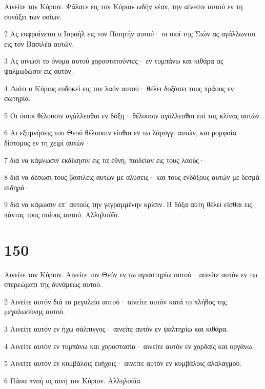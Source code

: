 \par Αινείτε τον Κύριον. Ψάλατε εις τον Κύριον ωδήν νέαν, την αίνεσιν αυτού εν τη συνάξει των οσίων.
\par 2 Ας ευφραίνεται ο Ισραήλ εις τον Ποιητήν αυτού· οι υιοί της Σιών ας αγάλλωνται εις τον Βασιλέα αυτών.
\par 3 Ας αινώσι το όνομα αυτού χοροστατούντες· εν τυμπάνω και κιθάρα ας ψαλμωδώσιν εις αυτόν.
\par 4 Διότι ο Κύριος ευδοκεί εις τον λαόν αυτού· θέλει δοξάσει τους πράους εν σωτηρία.
\par 5 Οι όσιοι θέλουσιν αγάλλεσθαι εν δόξη· θέλουσιν αγάλλεσθαι επί τας κλίνας αυτών.
\par 6 Αι εξυμνήσεις του Θεού θέλουσιν είσθαι εν τω λάρυγγι αυτών, και ρομφαία δίστομος εν τη χειρί αυτών·
\par 7 διά να κάμνωσιν εκδίκησιν εις τα έθνη, παιδείαν εις τους λαούς·
\par 8 διά να δέσωσι τους βασιλείς αυτών με αλύσεις· και τους ενδόξους αυτών με δεσμά σιδηρά·
\par 9 διά να κάμωσιν επ' αυτούς την γεγραμμένην κρίσιν. Η δόξα αύτη θέλει είσθαι εις πάντας τους οσίους αυτού. Αλληλούϊα.

\chapter{150}

\par Αινείτε τον Κύριον. Αινείτε τον Θεόν εν τω αγιαστηρίω αυτού· αινείτε αυτόν εν τω στερεώματι της δυνάμεως αυτού.
\par 2 Αινείτε αυτόν διά τα μεγαλεία αυτού· αινείτε αυτόν κατά το πλήθος της μεγαλωσύνης αυτού.
\par 3 Αινείτε αυτόν εν ήχω σάλπιγγος· αινείτε αυτόν εν ψαλτηρίω και κιθάρα.
\par 4 Αινείτε αυτόν εν τυμπάνω και χοροστασία· αινείτε αυτόν εν χορδαίς και οργάνω.
\par 5 Αινείτε αυτόν εν κυμβάλοις ευήχοις· αινείτε αυτόν εν κυμβάλοις αλαλαγμού.
\par 6 Πάσα πνοή ας αινή τον Κύριον. Αλληλούϊα.



